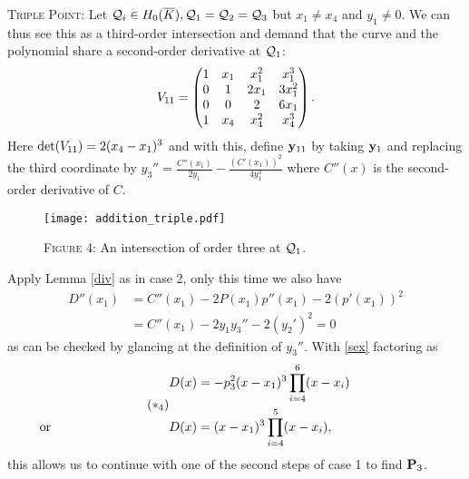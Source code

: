 \documentclass[english,11pt,a4paper]{article}
\begin{document}
\begin{case}
  {\scshape Triple Point:} Let $\q_i \in \enkb , \q_1=\q_2=\q_3$ but $x_1 \neq x_4$ and $y_1 \neq 0$. We can thus see this as a third-order intersection and demand that the curve and the polynomial share a second-order derivative at $\q_1$:
  \begin{align*}\Vtri=
      \begin{pmatrix}
      1 & x_1 & x_1^2 & x_1^3\\
      0 & 1 & 2 x_1 & 3 x_1^2\\
      0 & 0 & 2 & 6x_1\\
      1 & x_4 & x_4^2 & x_4^3\\
    \end{pmatrix}.
  \end{align*}
  Here $\det(\Vtri)=2(x_4-x_1)^3$ and with this, define $\ytri$ by taking $\ydoub$ and replacing the third coordinate by $y_3'' = \frac{C''(x_1)}{2y_1}-\frac{(C'(x_1))^2}{4y_1^3}$ where $C''(x)$ is the second-order derivative of $C$.

\begin{figure}[ht]
  \fline
  \begin{center}
    \vspace{1mm}
    \texttt{[image: addition\_triple.pdf]}

    {\scshape Figure 4}: An intersection of order three at $\q_1$.
  \end{center}
  \vspace{-1.5mm}
  \fline
\end{figure}

  Apply Lemma \ref{div} as in case 2, only this time we also have
  \begin{align*}
    D''(x_1) &= C''(x_1) - 2 P(x_1)p''(x_1) - 2 (p'(x_1))^2\\
             &= C''(x_1) - 2 y_1 y_3''- 2(y_2')^2 = 0
  \end{align*}
  as can be checked by glancing at the definition of $y_3''$. With \eqref{sex} factoring as
  \begin{align} \tag{$*_4$} \begin{split}
    D(x) &= -p_3^2(x-x_1)^3 \prod_{i=4}^6(x-x_i) \\
    \rlap{\hspace{-37mm} or}
    D(x) &= (x-x_1)^3 \prod_{i=4}^5(x-x_i),
  \end{split} \end{align}
  this allows us to continue with one of the second steps of case 1 to find $\P_3$.
\end{case}
\end{document}
